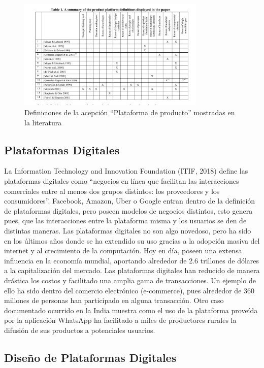 \begin{figure}[H]
\centering
\includegraphics[width=0.80\textwidth]{img/1.png}
\caption{Definiciones de la acepción “Plataforma de producto” mostradas en la literatura \cite{kristjansson2004term}}
\label{figure:platformDefinitions}
\end{figure}

\subsection{Plataformas Digitales}

La Information Technology and Innovation Foundation (ITIF, 2018) define las plataformas digitales como “negocios en línea que facilitan las interacciones comerciales entre al menos dos grupos distintos: los proveedores  y los consumidores”. Facebook, Amazon, Uber o Google entran dentro de la definición de plataformas digitales, pero poseen modelos de negocios distintos, esto genera pues, que las interacciones entre la plataforma misma y los usuarios se den de distintas maneras.
Las plataformas digitales no son algo novedoso, pero ha sido en los últimos años donde se ha extendido su uso gracias a la adopción masiva del internet y al crecimiento de la computación. Hoy en día, poseen una extensa influencia en la economía mundial, aportando alrededor de 2.6 trillones de dólares a la capitalización del mercado.
Las plataformas digitales han reducido de manera drástica los costos y facilitado una amplia gama de transacciones. Un ejemplo de ello ha sido dentro del comercio electrónico (e-commerce), pues alrededor de 360 millones de personas han  participado en alguna transacción. Otro caso documentado ocurrido en la India muestra como el uso de la plataforma proveída por la aplicación WhatsApp ha facilitado a miles de productores rurales la difusión de sus productos a potenciales usuarios.

\subsection{Diseño de Plataformas Digitales}

